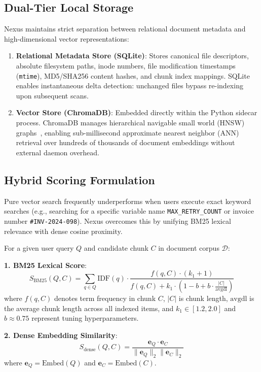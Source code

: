 \documentclass[pdflatex,sn-mathphys-num]{sn-jnl}%
\theoremstyle{thmstyleone}%
\theoremstyle{thmstyletwo}%
\theoremstyle{thmstylethree}%
\begin{document}
\subsection{Dual-Tier Local Storage}\label{subsec5_1}
Nexus maintains strict separation between relational document metadata and high-dimensional vector representations:
\begin{enumerate}
    \item \textbf{Relational Metadata Store (SQLite)}: Stores canonical file descriptors, absolute filesystem paths, inode numbers, file modification timestamps (\texttt{mtime}), MD5/SHA256 content hashes, and chunk index mappings. SQLite enables instantaneous delta detection: unchanged files bypass re-indexing upon subsequent scans.
    \item \textbf{Vector Store (ChromaDB)}: Embedded directly within the Python sidecar process. ChromaDB manages hierarchical navigable small world (HNSW) graphs~\cite{malkov2018efficient}, enabling sub-millisecond approximate nearest neighbor (ANN) retrieval over hundreds of thousands of document embeddings without external daemon overhead.
\end{enumerate}

\subsection{Hybrid Scoring Formulation}\label{subsec5_2}
Pure vector search frequently underperforms when users execute exact keyword searches (e.g., searching for a specific variable name \texttt{MAX\_RETRY\_COUNT} or invoice number \texttt{\#INV-2024-098}). Nexus overcomes this by unifying BM25 lexical relevance with dense cosine proximity.

For a given user query $Q$ and candidate chunk $C$ in document corpus $\mathcal{D}$:

\noindent\textbf{1. BM25 Lexical Score}:
\begin{equation}
S_{\text{BM25}}(Q, C) = \sum_{q \in Q} \text{IDF}(q) \cdot \frac{f(q, C) \cdot (k_1 + 1)}{f(q, C) + k_1 \cdot \left(1 - b + b \cdot \frac{|C|}{\text{avgdl}}\right)}\label{eq_bm25}
\end{equation}
where $f(q, C)$ denotes term frequency in chunk $C$, $|C|$ is chunk length, $\text{avgdl}$ is the average chunk length across all indexed items, and $k_1 \in [1.2, 2.0]$ and $b \approx 0.75$ represent tuning hyperparameters.

\noindent\textbf{2. Dense Embedding Similarity}:
\begin{equation}
S_{\text{dense}}(Q, C) = \frac{\mathbf{e}_Q \cdot \mathbf{e}_C}{\|\mathbf{e}_Q\|_2 \|\mathbf{e}_C\|_2}\label{eq_dense}
\end{equation}
where $\mathbf{e}_Q = \text{Embed}(Q)$ and $\mathbf{e}_C = \text{Embed}(C)$.
\end{document}
